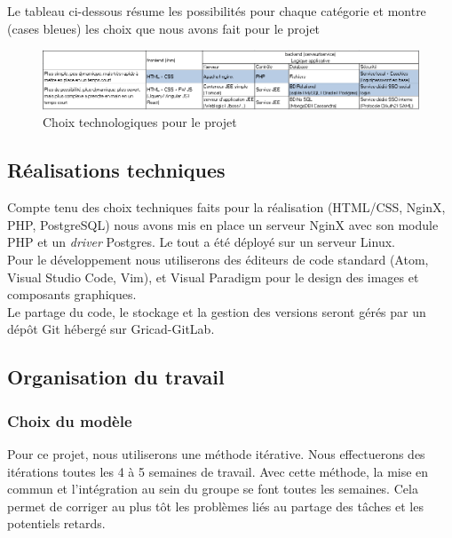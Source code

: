 \documentclass[a4paper,11pt]{article}
\begin{document}
Le tableau ci-dessous résume les possibilités pour chaque catégorie et montre (cases bleues)
les choix que nous avons fait pour le projet \\

\begin{figure}[H]
  \includegraphics[width=\linewidth]{images/choixTechno.PNG}
  \caption{Choix technologiques pour le projet}
  \label{fig:choix-techno}
\end{figure}

\subsection{Réalisations techniques}

Compte tenu des choix techniques faits pour la réalisation (HTML/CSS, NginX, PHP, PostgreSQL) nous avons
mis en place un serveur NginX avec son module PHP et un \textit{driver} Postgres. Le tout a été déployé
sur un serveur Linux.\\

Pour le développement nous utiliserons des éditeurs de code standard (Atom, Visual Studio Code, Vim), et Visual Paradigm
pour le design des images et composants graphiques.\\

Le partage du code, le stockage et la gestion des versions seront gérés par un dépôt Git hébergé sur
Gricad-GitLab.\\

\subsection{Organisation du travail}

\subsubsection{Choix du modèle}

Pour ce projet, nous utiliserons une méthode itérative. Nous effectuerons des itérations toutes les 4
à 5 semaines de travail. Avec cette méthode, la mise en commun et l'intégration au sein du groupe se font toutes les semaines.
Cela permet de corriger au plus tôt les problèmes liés au partage des tâches et les potentiels retards.\\
\end{document}
